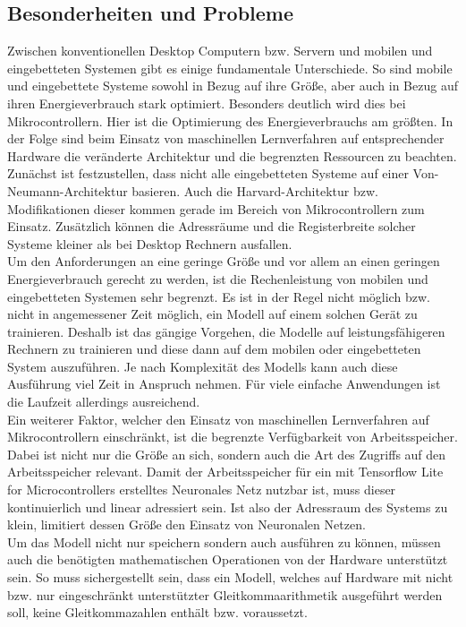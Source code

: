 \subsection{Besonderheiten und Probleme}\label{subsec:Besonderheiten und Probleme}
    Zwischen konventionellen Desktop Computern bzw. Servern und mobilen und eingebetteten Systemen gibt es einige fundamentale Unterschiede. So sind mobile und eingebettete Systeme sowohl in Bezug auf ihre Größe, aber auch in Bezug auf ihren Energieverbrauch stark optimiert. Besonders deutlich wird dies bei Mikrocontrollern. Hier ist die Optimierung des Energieverbrauchs am größten. In der Folge sind beim Einsatz von maschinellen Lernverfahren auf entsprechender Hardware die veränderte Architektur und die begrenzten Ressourcen zu beachten\cite{warden2020tinyml}.\\ Zunächst ist festzustellen, dass nicht alle eingebetteten Systeme auf einer Von-Neumann-Architektur basieren. Auch die Harvard-Architektur bzw. Modifikationen dieser kommen gerade im Bereich von Mikrocontrollern zum Einsatz. Zusätzlich können die Adressräume und die Registerbreite solcher Systeme kleiner als bei Desktop Rechnern ausfallen\cite{Currie2021}.\\ Um den Anforderungen an eine geringe Größe und vor allem an einen geringen Energieverbrauch gerecht zu werden, ist die Rechenleistung von mobilen und eingebetteten Systemen sehr begrenzt. Es ist in der Regel nicht möglich bzw. nicht in angemessener Zeit möglich, ein Modell auf einem solchen Gerät zu trainieren. Deshalb ist das gängige Vorgehen, die Modelle auf leistungsfähigeren Rechnern zu trainieren und diese dann auf dem mobilen oder eingebetteten System auszuführen. Je nach Komplexität des Modells kann auch diese Ausführung viel Zeit in Anspruch nehmen. Für viele einfache Anwendungen ist die Laufzeit allerdings ausreichend\cite{TFLITE}.\\ Ein weiterer Faktor, welcher den Einsatz von maschinellen Lernverfahren auf Mikrocontrollern einschränkt, ist die begrenzte Verfügbarkeit von Arbeitsspeicher. Dabei ist nicht nur die Größe an sich, sondern auch die Art des Zugriffs auf den Arbeitsspeicher relevant. Damit der Arbeitsspeicher für ein mit Tensorflow Lite for Microcontrollers erstelltes Neuronales Netz nutzbar ist, muss dieser kontinuierlich und linear adressiert sein. Ist also der Adressraum des Systems zu klein, limitiert dessen Größe den Einsatz von Neuronalen Netzen\cite{warden2020tinyml}.\\ Um das Modell nicht nur speichern sondern auch ausführen zu können, müssen auch die benötigten mathematischen Operationen von der Hardware unterstützt sein. So muss sichergestellt sein, dass ein Modell, welches auf Hardware mit nicht bzw. nur eingeschränkt unterstützter Gleitkommaarithmetik ausgeführt werden soll, keine Gleitkommazahlen enthält bzw. voraussetzt\cite{warden2020tinyml}.

